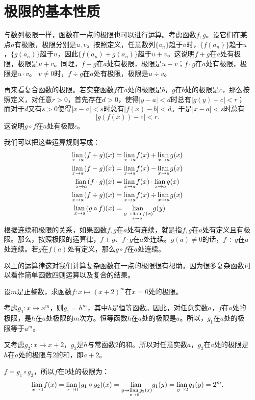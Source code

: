 \documentclass[12pt,UTF8,fontset=none]{ctexbook}
\begin{document}
\section{极限的基本性质}
与数列极限一样，函数在一点的极限也可以进行运算。考虑函数$f,g$。设它们在某点$a$有极限，极限分别是$u, v$。按照定义，任意数列$\{a_n\}$趋于$a$时，$\{f(a_n)\}$趋于$u$，$\{g(a_n)\}$趋于$u$，因此$\{f(a_n) + g(a_n)\}$趋于$u + v$。这说明$f + g$在$a$处有极限，极限是$u + v$。同理，$f - g$在$a$处有极限，极限是$u - v$；$f \cdot g$在$a$处有极限，极限是$u \cdot v$。
$v\neq 0$时，$f\div g$在$a$处有极限，极限是$u \div v$。

再来看复合函数的极限。若实变函数$f$在$a$处的极限是$b$，$g$在$b$处的极限是$c$，那么按照定义，对任意$r>0$，首先存在$d>0$，使得$|y - a|<d$时总有$|g(y) - c| < r$；而对于$d$又有$s>0$使得$|x - a|<s$时总有$|f(x) - b| < d$。于是$|x - a|<s$时总有
$$|g(f(x)) - c| < r.$$
这说明$g\circ f$在$a$处有极限$c$。

我们可以把这些运算规则写成：
\begin{align*}
    \underset{x \to a}{\operatorname{lian}\,} (f + g)(x) &= \underset{x \to a}{\operatorname{lian}\,} f(x) + \underset{x \to a}{\operatorname{lian}\,} g(x)  \\
    \underset{x \to a}{\operatorname{lian}\,} (f - g)(x) &= \underset{x \to a}{\operatorname{lian}\,} f(x) - \underset{x \to a}{\operatorname{lian}\,} g(x)  \\
    \underset{x \to a}{\operatorname{lian}\,} (f \cdot g)(x) &= \underset{x \to a}{\operatorname{lian}\,} f(x) \cdot \underset{x \to a}{\operatorname{lian}\,} g(x)  \\
    \underset{x \to a}{\operatorname{lian}\,} (f \div g)(x) &= \underset{x \to a}{\operatorname{lian}\,} f(x) \div \underset{x \to a}{\operatorname{lian}\,} g(x)\\
    \underset{x\to a}{\operatorname{lian}\,} (g\circ f)(x) &=  \underset{y \to \underset{x \to a}{\operatorname{lian}\,} f(x)}{\operatorname{lian}\,} g(y)
\end{align*}
根据连续和极限的关系，如果函数$f,g$在$a$处有连续，就是指$f,g$在$a$处有定义且有极限。那么，按照极限的运算律，$f\pm g$、$f\cdot g$在$a$处连续。$g(a)\neq 0$的话，$f\div g$在$a$处连续。若$g$在$f(a)$处有定义，那么$g\circ f$在$a$处连续。

以上的运算律这对我们计算复杂函数在一点的极限很有帮助。因为很多复杂函数可以看作简单函数四则运算以及复合的结果。
\begin{et}
    设$m$是正整数，求函数$f:x\mapsto (x+2)^m$在$x=0$处的极限。
\end{et}
\begin{so}
    考虑$g_1: x\mapsto x^m$，则$g_1 = h^m$，其中$h$是恒等函数。因此，对任意实数$a$，$f$在$a$处的极限，是$h$在$a$处极限的$m$次方。恒等函数$h$在$a$处的极限是$a$。所以，$g_1$在$a$处的极限等于$a^m$。

    又考虑$g_2: x\mapsto x + 2$，$g_2$是$h$与常函数$2$的和。所以对任意实数$a$，$g_2$在$a$处的极限是$h$在$a$处的极限与$2$的和，即$a+2$。
    
    $f = g_1\circ g_2$，所以$f$在$0$处的极限为：
    $$ \underset{x\to 0}{\operatorname{lian}\,} f(x) = \underset{x\to 0}{\operatorname{lian}\,} (g_1\circ g_2)(x) = \underset{y \to \underset{x \to 0}{\operatorname{lian}\,} g_2(x)}{\operatorname{lian}\,} g_1(y) =  \underset{y \to 2}{\operatorname{lian}\,} g_1(y) = 2^m. $$

\end{so}
\end{document}
